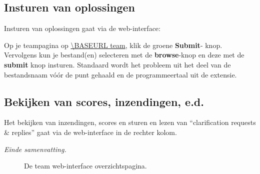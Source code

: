 \subsection*{Insturen van oplossingen}

Insturen van oplossingen gaat via%
de web-interface:
\begin{description}[\breaklabel\setlabelstyle{\bfseries}]
\item[Web-Interface]
Op je teampagina op \url{\BASEURL team}, klik de groene \textbf{Submit}-
knop. Vervolgens kun je bestand(en) selecteren met de \textbf{browse}-knop
en deze met de \textbf{submit} knop insturen.
Standaard wordt het probleem uit het deel van de bestandsnaam v\'o\'or
de punt gehaald en de programmeertaal uit de extensie.

\end{description}

\subsection*{Bekijken van scores, inzendingen, e.d.}

Het bekijken van inzendingen, scores en sturen en lezen van
``clarification requests \& replies'' gaat via de web-interface in de rechter kolom.

\emph{Einde samenvatting.}

\begin{figure}[p]
  \centering
  \caption{De team web-interface overzichtspagina.}
  \label{fig:team-overview}
\end{figure}

